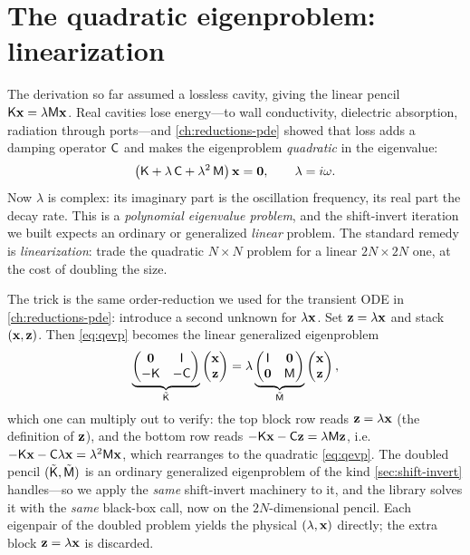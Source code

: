 \section{The quadratic eigenproblem: linearization}
\label{sec:quadratic}

The derivation so far assumed a lossless cavity, giving the linear pencil
$\mathsf{K}\mathbf{x}=\lambda\mathsf{M}\mathbf{x}$. Real cavities lose energy---to wall conductivity,
dielectric absorption, radiation through ports---and \cref{ch:reductions-pde}
showed that loss adds a damping operator $\mathsf{C}$ and makes the eigenproblem
\emph{quadratic} in the eigenvalue:
\begin{equation}
  \bigl(\mathsf{K} + \lambda\,\mathsf{C} + \lambda^2\,\mathsf{M}\bigr)\,\mathbf{x} = \mathbf 0,
  \qquad \lambda = i\omega.
  \label{eq:qevp}
\end{equation}
Now $\lambda$ is complex: its imaginary part is the oscillation frequency, its
real part the decay rate. This is a \emph{polynomial eigenvalue problem}, and the
shift-invert iteration we built expects an ordinary or generalized \emph{linear}
problem. The standard remedy is \emph{linearization}: trade the quadratic
$N\times N$ problem for a linear $2N\times 2N$ one, at the cost of doubling the
size.

The trick is the same order-reduction we used for the transient ODE in
\cref{ch:reductions-pde}: introduce a second unknown for $\lambda\mathbf{x}$. Set
$\mathbf{z}=\lambda\mathbf{x}$ and stack $(\mathbf{x},\mathbf{z})$. Then \cref{eq:qevp} becomes the linear
generalized eigenproblem
\begin{equation}
  \underbrace{\begin{pmatrix} \mathbf 0 & \mathsf{I} \\ -\mathsf{K} & -\mathsf{C} \end{pmatrix}}_{\tilde{\mathsf{K}}}
  \begin{pmatrix}\mathbf{x}\\\mathbf{z}\end{pmatrix}
  =
  \lambda
  \underbrace{\begin{pmatrix} \mathsf{I} & \mathbf 0 \\ \mathbf 0 & \mathsf{M} \end{pmatrix}}_{\tilde{\mathsf{M}}}
  \begin{pmatrix}\mathbf{x}\\\mathbf{z}\end{pmatrix},
  \label{eq:linearization}
\end{equation}
which one can multiply out to verify: the top block row reads $\mathbf{z}=\lambda\mathbf{x}$
(the definition of $\mathbf{z}$), and the bottom row reads
$-\mathsf{K}\mathbf{x}-\mathsf{C}\mathbf{z}=\lambda\mathsf{M}\mathbf{z}$, i.e.
$-\mathsf{K}\mathbf{x}-\mathsf{C}\lambda\mathbf{x}=\lambda^2\mathsf{M}\mathbf{x}$, which rearranges to the quadratic
\cref{eq:qevp}. The doubled pencil $(\tilde{\mathsf{K}},\tilde{\mathsf{M}})$ is an ordinary
generalized eigenproblem of the kind \cref{sec:shift-invert} handles---so we apply
the \emph{same} shift-invert machinery to it, and the library solves it with the
\emph{same} black-box call, now on the $2N$-dimensional pencil. Each eigenpair of
the doubled problem yields the physical $(\lambda,\mathbf{x})$ directly; the extra block
$\mathbf{z}=\lambda\mathbf{x}$ is discarded.

